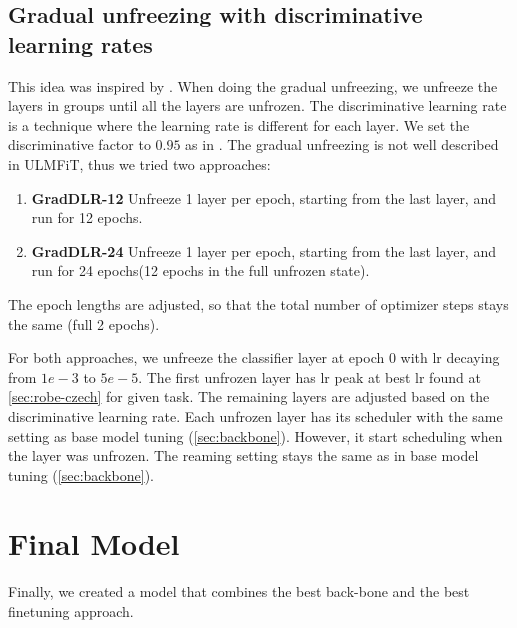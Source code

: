 \subsection{Gradual unfreezing with discriminative learning rates}
\label{sec:gradual-unfreezing}
This idea was inspired by \cite{howardUniversalLanguageModel2018a}.
When doing the gradual unfreezing, we unfreeze the layers in groups until all the layers are unfrozen.
The discriminative learning rate is a technique where the learning rate is different for each layer.
We set the discriminative factor to $0.95$ as in \cite{sunHowFineTuneBERT2020}.
The gradual unfreezing is not well described in ULMFiT, thus we tried two approaches:
\begin{enumerate}
    \item \textbf{GradDLR-12} Unfreeze 1 layer per epoch, starting from the last layer, and run for 12 epochs.
    \item \textbf{GradDLR-24} Unfreeze 1 layer per epoch,
    starting from the last layer, and run for 24 epochs(12 epochs in the full unfrozen state).
\end{enumerate}
The epoch lengths are adjusted, so that the total number of optimizer steps stays the same (full 2 epochs).

For both approaches, we unfreeze the classifier layer at epoch 0 with lr decaying from $1e-3$ to $ 5e-5$.
The first unfrozen layer has lr peak at best lr found at \autoref{sec:robe-czech} for given task.
The remaining layers are adjusted based on the discriminative learning rate.
Each unfrozen layer has its scheduler with the same setting as base model tuning (\autoref{sec:backbone}).
 However, it start scheduling when the layer was unfrozen.
The reaming setting stays the same as in base model tuning (\autoref{sec:backbone}).

\section{Final Model}
\label{sec:final-model}
Finally, we created a model that combines the best back-bone and the best finetuning approach.
